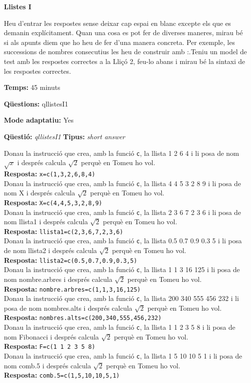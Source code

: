 \documentclass[10pt]{article}
\newcommand{\answer}{\textbf{Resposta: }}
\newcommand{\titletest}[1]{\centerline{\Large\textbf{#1}}\medskip}
\newcommand{\timetest}[1]{\noindent\textbf{Temps:} #1 minuts}
\newcommand{\questionstest}{\noindent\textbf{Qüestions: }}
\newcommand{\adaptativetest}{\noindent\textbf{Mode adaptatiu: }}
\newcommand{\newquestion}[2]{\noindent\textbf{Qüestió: }\emph{#1} \textbf{Tipus: }\emph{#2}\medskip}
\newenvironment{introtest}{}{\newpage}
\begin{document}
\begin{introtest}
\titletest{Llistes I}

Heu d'entrar les respostes sense deixar cap espai en blanc excepte els que es demanin explícitament. Quan una cosa es pot fer de diverses maneres, mirau bé si als apunts diem que ho heu de fer d'una manera concreta. Per exemple, les successions de nombres consecutius les heu de construir amb :.Teniu un model de test amb les respostes correctes a la Lliçó 2, feu-lo abans i mirau bé la sintaxi de les respostes correctes.  

\timetest{45}

\questionstest qllistesI1 

\adaptativetest Yes
\end{introtest}

\newquestion{qllistesI1}{short answer} 
\def\qllistesI1#1#2{Donau la instrucció que crea, amb la funció \texttt{c}, la llista #1 i li posa de nom #2 i després calcula $\sqrt{2}$ perquè en Tomeu ho vol.}

\qllistesI1{1  2 6  4}%
{$\sqrt{x}$}\\ 
\answer{\verb?x=c(1,3,2,6,8,4)?}\\

\qllistesI1{4 4 5 3 2 8 9}%
{X}\\ 
\answer{\verb?X=c(4,4,5,3,2,8,9)?}\\

\qllistesI1{2 3 6 7 2 3 6}%
{llista1}\\ 
\answer{\verb?llista1=c(2,3,6,7,2,3,6)?}\\

\qllistesI1{0.5 0.7 0.9 0.3 5}%
{llista2}\\ 
\answer{\verb?llista2=c(0.5,0.7,0.9,0.3,5)?}\\

\qllistesI1{1 1 3 16 125}%
{nombre.arbres}\\ 
\answer{\verb?nombre.arbres=c(1,1,3,16,125)?}\\

\qllistesI1{200 340 555 456 232}%
{nombres.alts}\\ 
\answer{\verb?nombres.alts=c(200,340,555,456,232)?}\\

\qllistesI1{1 1 2 3 5 8}%
{Fibonacci}\\ 
\answer{\verb?F=c(1 1 2 3 5 8)?}\\

\qllistesI1{1 5 10 10 5 1}%
{comb.5}\\ 
\answer{\verb?comb.5=c(1,5,10,10,5,1)?}\\
\end{document}
